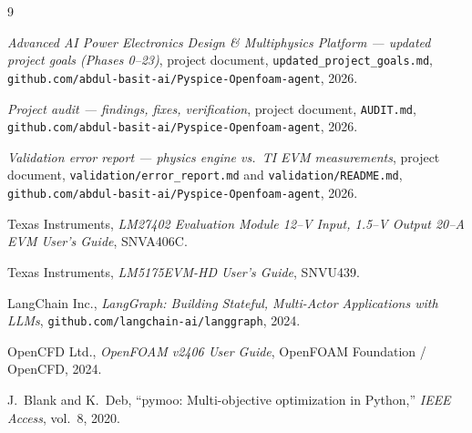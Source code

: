 \documentclass[conference]{IEEEtran}
\begin{document}
\begin{thebibliography}{9}

\emph{Advanced AI Power Electronics Design \& Multiphysics Platform ---
updated project goals (Phases 0--23)}, project document,
\texttt{updated\_project\_goals.md},
\texttt{github.com/abdul-basit-ai/Pyspice-Openfoam-agent}, 2026.

\emph{Project audit --- findings, fixes, verification},
project document, \texttt{AUDIT.md},
\texttt{github.com/abdul-basit-ai/Pyspice-Openfoam-agent}, 2026.

\emph{Validation error report --- physics engine vs.\ TI EVM
measurements}, project document, \texttt{validation/error\_report.md}
and \texttt{validation/README.md},
\texttt{github.com/abdul-basit-ai/Pyspice-Openfoam-agent}, 2026.

Texas Instruments, \emph{LM27402 Evaluation Module 12--V Input, 1.5--V
Output 20--A EVM User's Guide}, SNVA406C.

Texas Instruments, \emph{LM5175EVM-HD User's Guide}, SNVU439.

LangChain Inc., \emph{LangGraph: Building Stateful, Multi-Actor
Applications with LLMs}, \texttt{github.com/langchain-ai/langgraph}, 2024.

OpenCFD Ltd., \emph{OpenFOAM v2406 User Guide}, OpenFOAM Foundation /
OpenCFD, 2024.

J.~Blank and K.~Deb, ``pymoo: Multi-objective optimization in Python,''
\emph{IEEE Access}, vol.~8, 2020.

\end{thebibliography}
\end{document}
